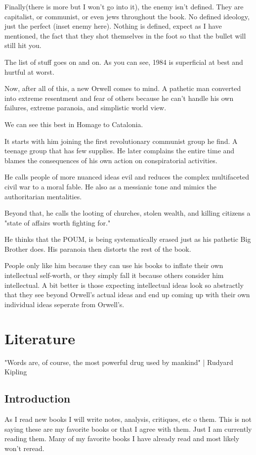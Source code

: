 \par Finally(there is more but I won't go into it), the enemy isn't defined. They are capitalist, or communist, or even jews throughout the book. No defined ideology, just the perfect (inset enemy here). Nothing is defined, expect as I have mentioned, the fact that they shot themselves in the foot so that the bullet will still hit you.
\par The list of stuff goes on and on. As you can see, 1984 is superficial at best and hurtful at worst.
\par Now, after all of this, a new Orwell comes to mind. A pathetic man converted into extreme resentment and fear of others because he can't handle his own failures, extreme paranoia, and simplistic world view.
\par We can see this best in Homage to Catalonia. 
\par It starts with him joining the first revolutionary communist group he find. A teenage group that has few supplies. He later complains the entire time and blames the consequences of his own action on conspiratorial activities.
\par He calls people of more nuanced ideas evil and reduces the complex multifaceted civil war to a moral fable. He also as a messianic tone and mimics the authoritarian mentalities.
\par Beyond that, he calls the looting of churches, stolen wealth, and killing citizens a "state of affairs worth fighting for."
\par He thinks that the POUM, is being systematically erased just as his pathetic Big Brother does. His paranoia then distorts the rest of the book.
\par People only like him because they can use his books to inflate their own intellectual self-worth, or they simply fall it because others consider him intellectual. A bit better is those expecting intellectual ideas look so abstractly that they see beyond Orwell's actual ideas and end up coming up with their own individual ideas seperate from Orwell's.
\chapter{Literature}
"Words are, of course, the most powerful drug used by mankind" | Rudyard Kipling
\section{Introduction}
\par As I read new books I will write notes, analysis, critiques, etc o them. This is not  saying these are my favorite books or that I agree with them. Just I am currently reading them. Many of my favorite books I have already read and most likely won't reread.

